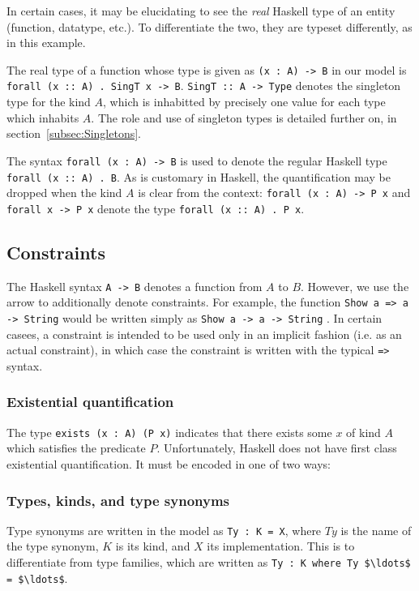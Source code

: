 In certain cases, it may be elucidating to see the \emph{real} Haskell type of
an entity (function, datatype, etc.). To differentiate the two, they are typeset
differently, as in this example.

The real type of a function whose type is given as \lstinline!(x : A) -> B! in
our model is \texttt{forall (x :: A) . SingT x -> B}. \texttt{SingT :: A -> 
Type}
denotes the singleton type for the kind $A$, which is inhabitted by precisely
one value for each type which inhabits $A$. The role and use of singleton types
is detailed further on, in section~\ref{subsec:Singletons}. 

The syntax \lstinline!forall (x : A) -> B! is used to denote the regular
Haskell type \texttt{forall (x :: A) . B}. As is customary in Haskell, the 
quantification
may be dropped when the kind $A$ is clear from the context: 
\lstinline!forall (x : A) -> P x! 
and
\lstinline!forall x -> P x! denote the type \texttt{forall (x :: A) . P x}.

\subsection{Constraints}
The Haskell syntax \texttt{A -> B} denotes a function from $A$ to $B$. However,
we use the arrow to additionally denote constraints. For example, the function
\texttt{Show a => a -> String} would be written simply as \lstinline!Show a -> a -> String!
.
In certain casees, a constraint is intended to be used only in an implicit 
fashion 
(i.e. as an actual constraint), in which case the constraint is written with 
the typical \lstinline{=>} syntax. 

\subsubsection*{Existential quantification}
The type \lstinline!exists (x : A) (P x)! indicates that there exists some $x$
of kind $A$ which satisfies the predicate $P$. Unfortunately, Haskell does not
have first class existential quantification. It must be encoded in one of
two ways:

\subsubsection*{Types, kinds, and type synonyms}
Type synonyms are written in the model as \lstinline!Ty : K = X!, where $Ty$ is 
the name
of the type synonym, $K$ is its kind, and $X$ its implementation. This is to 
differentiate
from type families, which are written as \lstinline!Ty : K where Ty $\ldots$ = $\ldots$!.

